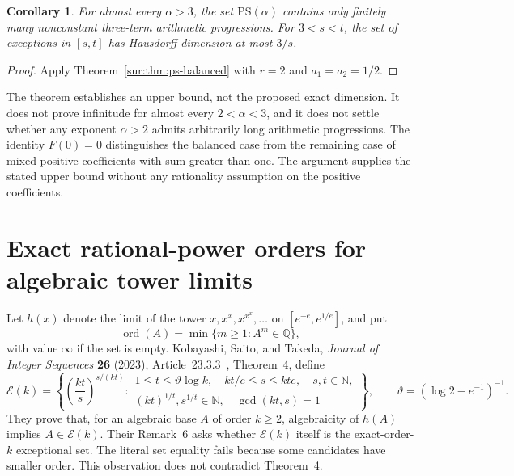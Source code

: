 \documentclass[11pt,a4paper]{article}
\newtheorem{corollary}[theorem]{Corollary}
\theoremstyle{definition}
\theoremstyle{remark}
\numberwithin{equation}{section}
\begin{document}
\begin{corollary}\label{sur:cor:ps-ap-three}
For almost every $\alpha>3$, the set $\mathrm{PS}(\alpha)$ contains
only finitely many nonconstant three-term arithmetic progressions.
For $3<s<t$, the set of exceptions in $[s,t]$ has Hausdorff dimension
at most $3/s$.
\end{corollary}
\begin{proof}
Apply Theorem~\ref{sur:thm:ps-balanced} with $r=2$ and
$a_1=a_2=1/2$.
\end{proof}

The theorem establishes an upper bound, not the proposed exact
dimension. It does not prove infinitude for almost every
$2<\alpha<3$, and it does not settle whether any exponent
$\alpha>2$ admits arbitrarily long arithmetic progressions.
The identity $F(0)=0$ distinguishes the balanced case from the
remaining case of mixed positive coefficients with sum greater
than one. The argument supplies the stated upper bound without any rationality
assumption on the positive coefficients.


\section{Exact rational-power orders for algebraic tower limits}\label{sur:exp-section}
Let $h(x)$ denote the limit of the tower $x,x^x,x^{x^x},\ldots$ on
$[e^{-e},e^{1/e}]$, and put
\[
 \operatorname{ord}(A)=\min\{m\ge1:A^m\in\mathbb Q\},
\]
with value $\infty$ if the set is empty.
Kobayashi, Saito, and Takeda, \emph{Journal of Integer Sequences}
\textbf{26} (2023), Article~23.3.3~\cite{KobayashiSaitoTakeda2023}, Theorem~4, define
\[
 \mathcal E(k)=\left\{
 \left(\frac{kt}{s}\right)^{s/(kt)}:
 \begin{array}{l}
 1\le t\le\vartheta\log k,\quad kt/e\le s\le kte,\quad s,t\in\mathbb N,\\
 (kt)^{1/t},s^{1/t}\in\mathbb N,\quad\gcd(kt,s)=1
 \end{array}\right\},
 \qquad \vartheta=(\log2-e^{-1})^{-1}.
\]
They prove that, for an algebraic base $A$ of order $k\ge2$,
algebraicity of $h(A)$ implies $A\in\mathcal E(k)$.
Their Remark~6 asks whether $\mathcal E(k)$ itself is the exact-order-$k$
exceptional set. The literal set equality fails because some candidates
have smaller order. This observation does not contradict Theorem~4.
\end{document}
